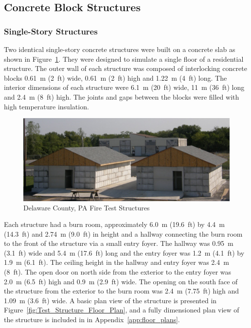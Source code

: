 \documentclass[12pt,oneside]{book}
\begin{document}
\subsection{Concrete Block Structures}
\label{sec:Experimental Structures}
\subsubsection*{Single-Story Structures}

Two identical single-story concrete structures were built on a concrete slab as shown in Figure~\ref{fig:Delaware_County,_PA_Fire_Test_Structures}. They were designed to simulate a single floor of a residential structure.  The outer wall of each structure was composed of interlocking concrete blocks 0.61~m (2~ft) wide, 0.61~m (2~ft) high and 1.22~m (4~ft) long.  The interior dimensions of each structure were 6.1~m (20~ft) wide, 11~m (36~ft) long and 2.4~m (8~ft) high. The joints and gaps between the blocks were filled with high temperature insulation.

\begin{figure}[!ht]
	\includegraphics[width=6in]{../Figures/Pictures/DelCo_Structures}
	\caption{Delaware County, PA Fire Test Structures}
	\label{fig:Delaware_County,_PA_Fire_Test_Structures}
\end{figure}

Each structure had a burn room, approximately 6.0~m (19.6~ft) by 4.4~m (14.3~ft) and 2.74~m (9.0~ft) in height and a hallway connecting the burn room to the front of the structure via a small entry foyer. The hallway was 0.95~m (3.1~ft) wide and 5.4~m (17.6~ft) long and the entry foyer was 1.2~m (4.1~ft) by 1.9~m (6.1~ft). The ceiling height in the hallway and entry foyer was 2.4~m (8~ft).  The open door on north side from the exterior to the entry foyer was 2.0~m (6.5~ft) high and 0.9~m (2.9~ft) wide. The opening on the south face of the structure from the exterior to the burn room was 2.4~m (7.75~ft) high and 1.09~m (3.6~ft) wide. A basic plan view of the structure is presented in Figure~\ref{fig:Test_Structure_Floor_Plan}, and a fully dimensioned plan view of the structure is included in in Appendix~\ref{app:floor_plans}.
\end{document}
